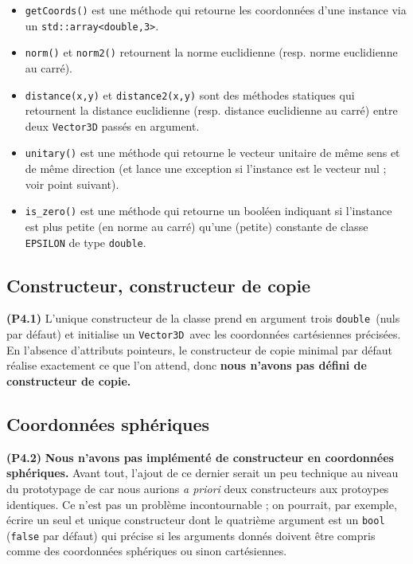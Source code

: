 \documentclass[12pt, letterpaper, twoside]{article}
\newcommand{\T}[1]{\texttt{#1}}
\newcommand{\V}[0]{\texttt{Vector3D}}
\newcommand{\double}{\texttt{double}}
\begin{document}
\begin{itemize}

\item \T{getCoords()} est une méthode qui retourne les coordonnées d'une instance via un \T{std::array<double,3>}.

\item \T{norm()} et \T{norm2()} retournent la norme euclidienne (resp. norme euclidienne au carré).

\item \T{distance(x,y)} et \T{distance2(x,y)} sont des méthodes statiques qui retournent la distance euclidienne (resp. distance euclidienne au carré) entre deux \T{Vector3D} passés en argument.

\item \T{unitary()} est une méthode qui retourne le vecteur unitaire de même sens et de même direction (et lance une exception si l'instance est le vecteur nul ; voir point suivant).

\item \T{is\_zero()} est une méthode qui retourne un booléen indiquant si l'instance est plus petite (en norme au carré) qu'une (petite) constante de classe \T{EPSILON} de type \double.
\end{itemize}

\subsection{Constructeur, constructeur de copie}
\noindent \textbf{(P4.1)} L'unique constructeur de la classe prend en argument trois \double\ (nuls par défaut) et initialise un \V\ avec les coordonnées cartésiennes précisées. En l'absence d'attributs pointeurs, le constructeur de copie minimal par défaut réalise exactement ce que l'on attend, donc \textbf{nous n'avons pas défini de constructeur de copie.}

\subsection{Coordonnées sphériques}
\noindent \textbf{(P4.2)} \textbf{Nous n’avons pas implémenté de constructeur en coordonnées sphériques.} Avant tout, l’ajout de ce dernier serait un peu technique au niveau du prototypage de car nous aurions \textit{a priori} deux constructeurs aux protoypes identiques. Ce n'est pas un problème incontournable ; on pourrait, par exemple, écrire un seul et unique constructeur dont le quatrième argument est un \T{bool} (\T{false} par défaut) qui précise si les arguments donnés doivent être compris comme des coordonnées sphériques ou sinon cartésiennes.
\end{document}
